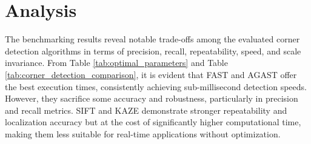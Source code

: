 \documentclass[journal]{IEEEtran}
\begin{document}
\onecolumn
\begin{table}
    \centering
\end{table}

\twocolumn


\section{Analysis}
\label{section:analysis}

The benchmarking results reveal notable trade-offs among the evaluated corner detection algorithms in terms of precision, recall, repeatability, speed, and scale invariance. From Table \ref{tab:optimal_parameters} and Table \ref{tab:corner_detection_comparison}, it is evident that FAST and AGAST offer the best execution times, consistently achieving sub-millisecond detection speeds. However, they sacrifice some accuracy and robustness, particularly in precision and recall metrics. SIFT and KAZE demonstrate stronger repeatability and localization accuracy but at the cost of significantly higher computational time, making them less suitable for real-time applications without optimization.\\
\end{document}
